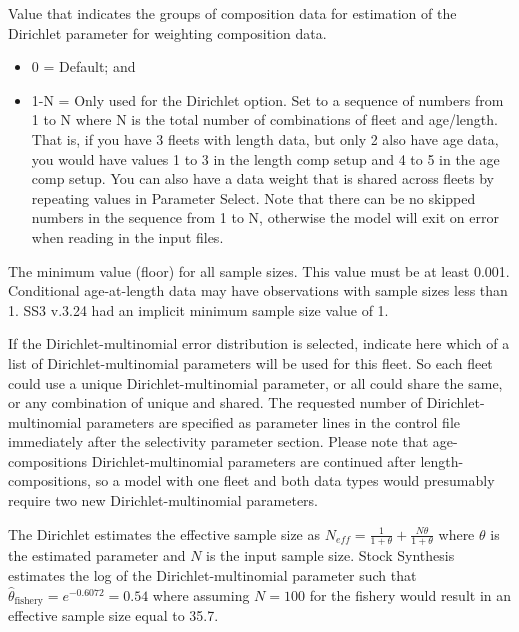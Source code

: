 
Value that indicates the groups of composition data for estimation of the Dirichlet parameter for weighting composition data.

\begin{itemize}
	\item 0 = Default; and
	\item 1-N = Only used for the Dirichlet option. Set to a sequence of numbers from 1 to N where N is the total number of combinations of fleet and age/length. That is, if you have 3 fleets with length data, but only 2 also have age data, you would have values 1 to 3 in the length comp setup and 4 to 5 in the age comp setup. You can also have a data weight that is shared across fleets by repeating values in Parameter Select. Note that there can be no skipped numbers in the sequence from 1 to N, otherwise the model will exit on error when reading in the input files.
\end{itemize}	

The minimum value (floor) for all sample sizes. This value must be at least 0.001. Conditional age-at-length data may have observations with sample sizes less than 1. SS3 v.3.24 had an implicit minimum sample size value of 1.

If the Dirichlet-multinomial error distribution is selected, indicate here which of a list of Dirichlet-multinomial parameters will be used for this fleet.  So each fleet could use a unique Dirichlet-multinomial parameter, or all could share the same, or any combination of unique and shared.  The requested number of Dirichlet-multinomial parameters are specified as parameter lines in the control file immediately after the selectivity parameter section. Please note that age-compositions Dirichlet-multinomial parameters are continued after length-compositions, so a model with one fleet and both data types would presumably require two new Dirichlet-multinomial parameters.  	
	
The Dirichlet estimates the effective sample size as $N_{eff}=\frac{1}{1+\theta}+\frac{N\theta}{1+\theta}$ where $\theta$ is the estimated parameter and $N$ is the input sample size.  Stock Synthesis estimates the log of the Dirichlet-multinomial parameter such that $\hat{\theta}_{\text{fishery}} = e^{-0.6072} = 0.54$ where assuming $N=100$ for the fishery would result in an effective sample size equal to 35.7.
	
